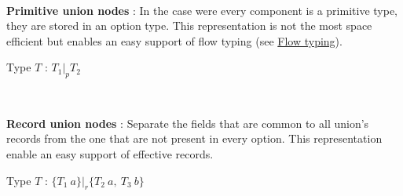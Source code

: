 \documentclass[10pt,a4paper]{article}
\begin{document}
\begin{itemize}
	\item[] 
	\begin{minipage}[b]{.95\textwidth}
		\begin{figure}
		\end{figure}
		~%
		\item \textbf{Primitive union nodes} : In the case were every component is a primitive type, they are stored in an option type. This representation is not the most space efficient but enables an easy support of flow typing (see \hyperref[FlowT]{Flow typing}).
		\begin{flushright}
			Type $T$ : $T_1|_pT_2$
		\end{flushright}
	\end{minipage} 
	
	\item[] 
	\begin{minipage}[b]{.95\textwidth}
		\begin{figure}
		\end{figure}
		~%
		\item \textbf{Record union nodes} : Separate the fields that are common to all union's records from the one that are not present in every option. This representation enable an easy support of effective records.
		\begin{flushright}
			Type $T$ : $\{T_1~a\}|_r\{T_2 ~a,~T_3~b\}$
		\end{flushright}
	\end{minipage} 
	

\end{itemize}
\end{document}
